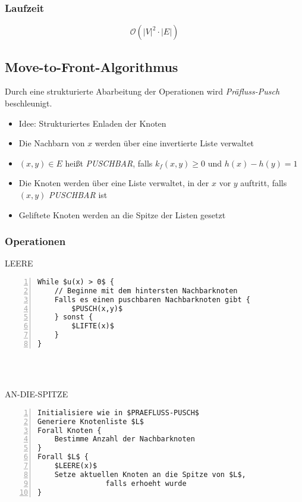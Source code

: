 \subsubsection{Laufzeit}
\[\mathcal{O} (|V|^2 \cdot |E|)\]


\subsection{Move-to-Front-Algorithmus}
Durch eine strukturierte Abarbeitung der Operationen wird \textit{Präfluss-Pusch} beschleunigt.

\begin{itemize}
	\item Idee: Strukturiertes Enladen der Knoten
	\item Die Nachbarn von \(x\) werden über eine invertierte Liste verwaltet
	\item \((x,y) \in E\) heißt \textit{PUSCHBAR}, falls \(k_f(x,y) \geq 0\) und \(h(x)-h(y)=1\)
	\item Die Knoten werden über eine Liste verwaltet, in der \(x\) vor \(y\) auftritt, falls \((x,y)\) \textit{PUSCHBAR} ist
	\item Geliftete Knoten werden an die Spitze der Listen gesetzt
\end{itemize}

\subsubsection{Operationen}

\begin{minipage}{\textwidth}
LEERE
\begin{lstlisting}[frame=single,numbers=left,mathescape]
While $u(x) > 0$ {
	// Beginne mit dem hintersten Nachbarknoten
	Falls es einen puschbaren Nachbarknoten gibt {
		$PUSCH(x,y)$
	} sonst {
		$LIFTE(x)$
	}
}
\end{lstlisting}
\end{minipage}
\\\\
\begin{minipage}{\textwidth}
AN-DIE-SPITZE
\begin{lstlisting}[frame=single,numbers=left,mathescape]
Initialisiere wie in $PRAEFLUSS-PUSCH$
Generiere Knotenliste $L$
Forall Knoten {
	Bestimme Anzahl der Nachbarknoten
}
Forall $L$ {
	$LEERE(x)$
	Setze aktuellen Knoten an die Spitze von $L$,
				falls erhoeht wurde
}
\end{lstlisting}
\end{minipage}

